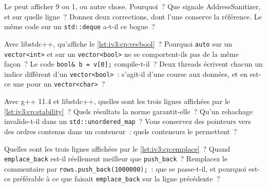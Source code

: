 \begin{question}\label{iq:iv3:cpp:26}
Le  peut afficher 9 ou 1, ou autre chose. Pourquoi~? Que signale AddressSanitizer, et sur quelle ligne~? Donnez deux corrections, dont l'une conserve la référence. Le même code sur un \texttt{std::deque} a-t-il ce bogue~?
\label{lst:iv3:cp:vecref}
\end{question}

\begin{question}\label{iq:iv3:cpp:27}
Avec libstdc++, qu'affiche le \cref{lst:iv3:cp:vecbool}~? Pourquoi \texttt{auto} sur un \texttt{vector<int>} et sur un \texttt{vector<bool>} ne se comportent-ils pas de la même façon~? Le code \texttt{bool\& b = v[0];} compile-t-il~? Deux threads écrivent chacun un indice différent d'un \texttt{vector<bool>}~: s'agit-il d'une course aux données, et en est-ce une pour un \texttt{vector<char>}~?
\label{lst:iv3:cp:vecbool}
\end{question}

\begin{question}\label{iq:iv3:cpp:28}
Avec g++ 11.4 et libstdc++, quelles sont les trois lignes affichées par le \cref{lst:iv3:cp:stability}~? Quels résultats la norme garantit-elle~? Qu'un rehachage invalide-t-il dans un \texttt{std::unordered\_map}~? Vous conservez des pointeurs vers des ordres contenus dans un conteneur~: quels conteneurs le permettent~?
\label{lst:iv3:cp:stability}
\end{question}

\begin{question}\label{iq:iv3:cpp:29}
Quelles sont les trois lignes affichées par le \cref{lst:iv3:cp:emplace}~? Quand \texttt{emplace\_back} est-il réellement meilleur que \texttt{push\_back}~? Remplacez le commentaire par \texttt{rows.push\_back(1000000);}~: que se passe-t-il, et pourquoi est-ce préférable à ce que faisait \texttt{emplace\_back} sur la ligne précédente~?
\label{lst:iv3:cp:emplace}
\end{question}

